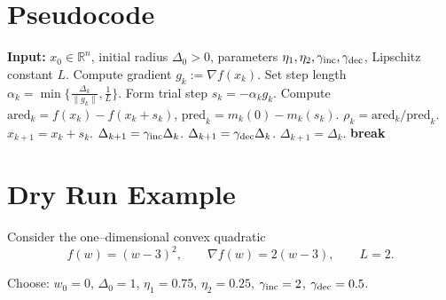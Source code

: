 \documentclass{article}
\begin{document}
\section*{Pseudocode}
\begin{algorithm}[H]
\caption{Trust Region Gradient Method (TRGM)}
\begin{algorithmic}[1]
\STATE \textbf{Input:} $x_0\in\mathbb{R}^n$, initial radius $\Delta_0>0$, parameters
$\eta_1,\eta_2,\gamma_{\rm inc},\gamma_{\rm dec}$, Lipschitz constant $L$.
    \STATE Compute gradient $g_k:=\nabla f(x_k)$.
    \STATE Set step length 
    $\displaystyle \alpha_k=\min\Big\{\frac{\Delta_k}{\|g_k\|},\frac{1}{L}\Big\}$.
    \STATE Form trial step $s_k=-\alpha_k g_k$.
    \STATE Compute 
    $\text{ared}_k=f(x_k)-f(x_k+s_k)$,
    $\text{pred}_k=m_k(0)-m_k(s_k)$.
    \STATE $\rho_k=\text{ared}_k/\text{pred}_k$.
    \STATE $x_{k+1}=x_k+s_k$.
        \STATE $\Delta_{k+1}=\gamma_{\rm inc}\Delta_k$.
        \STATE $\Delta_{k+1}=\gamma_{\rm dec}\Delta_k$.
    \ELSE
        \STATE $\Delta_{k+1}=\Delta_k$.
    \ENDIF
        \STATE \textbf{break}
    \ENDIF
\ENDFOR
\end{algorithmic}
\end{algorithm}

\section*{Dry Run Example}
Consider the one–dimensional convex quadratic
\[
f(w)=(w-3)^2,
\qquad \nabla f(w)=2(w-3),\qquad L=2 .
\]

Choose: $w_0=0$, $\Delta_0=1$, $\eta_1=0.75$, $\eta_2=0.25$, 
$\gamma_{\rm inc}=2$, $\gamma_{\rm dec}=0.5$.
\end{document}
